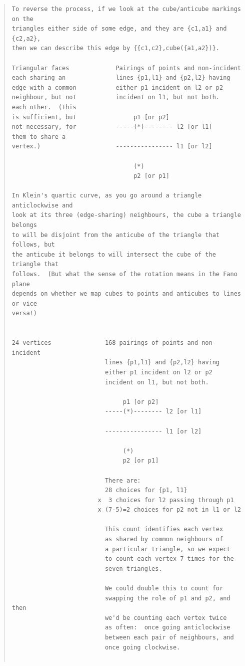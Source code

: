 \documentclass{article}
\begin{document}
\begin{quote}
\begin{verbatim}
To reverse the process, if we look at the cube/anticube markings on the 
triangles either side of some edge, and they are {c1,a1} and {c2,a2}, 
then we can describe this edge by {{c1,c2},cube({a1,a2})}.

Triangular faces             Pairings of points and non-incident
each sharing an              lines {p1,l1} and {p2,l2} having
edge with a common           either p1 incident on l2 or p2
neighbour, but not           incident on l1, but not both.
each other.  (This
is sufficient, but                p1 [or p2]
not necessary, for           -----(*)-------- l2 [or l1]
them to share a
vertex.)                     ---------------- l1 [or l2]

                                  (*)
                                  p2 [or p1]

In Klein's quartic curve, as you go around a triangle anticlockwise and 
look at its three (edge-sharing) neighbours, the cube a triangle belongs 
to will be disjoint from the anticube of the triangle that follows, but 
the anticube it belongs to will intersect the cube of the triangle that 
follows.  (But what the sense of the rotation means in the Fano plane 
depends on whether we map cubes to points and anticubes to lines or vice 
versa!) 


24 vertices               168 pairings of points and non-incident
                          lines {p1,l1} and {p2,l2} having
                          either p1 incident on l2 or p2
                          incident on l1, but not both.

                               p1 [or p2]
                          -----(*)-------- l2 [or l1]

                          ---------------- l1 [or l2]

                               (*)
                               p2 [or p1]

                          There are:
                          28 choices for {p1, l1}
                        x  3 choices for l2 passing through p1
                        x (7-5)=2 choices for p2 not in l1 or l2

                          This count identifies each vertex
                          as shared by common neighbours of
                          a particular triangle, so we expect
                          to count each vertex 7 times for the
                          seven triangles.

                          We could double this to count for
                          swapping the role of p1 and p2, and then
                          we'd be counting each vertex twice
                          as often:  once going anticlockwise
                          between each pair of neighbours, and
                          once going clockwise.


\end{verbatim}
\end{quote}
\end{document}
